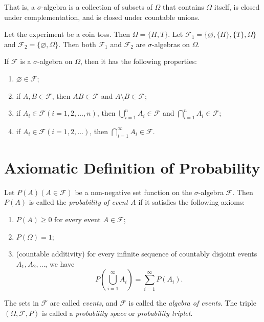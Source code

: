That is, a \(\sigma\)-algebra is a collection of subsets of \(\Omega\) that contains \(\Omega\) itself, is closed under complementation, and is closed under countable unions.

\begin{example}
  Let the experiment be a coin toss. Then \(\Omega = \{H, T\}\). Let \(\mathcal{F}_1 = \{\varnothing, \{H\}, \{T\}, \Omega\}\) and \(\mathcal{F}_2 = \{\varnothing, \Omega\}\). Then both \(\mathcal{F}_1\) and \(\mathcal{F}_2\) are \(\sigma\)-algebras on \(\Omega\).
\end{example}

\begin{proposition}
  If \(\mathcal{F}\) is a \(\sigma\)-algebra on \(\Omega\), then it has the following properties:
  \begin{enumerate}
    \item \(\varnothing \in \mathcal{F}\);
    \item if \(A, B \in \mathcal{F}\), then \(A B \in \mathcal{F}\) and \(A \setminus B \in \mathcal{F}\);
    \item if \(A_i \in \mathcal{F} (i = 1, 2, \dots, n)\), then \(\bigcup_{i=1}^n A_i \in \mathcal{F}\) and \(\bigcap_{i=1}^n A_i \in \mathcal{F}\);
    \item if \(A_i \in \mathcal{F} (i = 1, 2, \dots)\), then \(\bigcap_{i=1}^\infty A_i \in \mathcal{F}\).
  \end{enumerate}
\end{proposition}

\section{Axiomatic Definition of Probability}

\begin{definition}[Probability]
  Let \(P(A) (A \in \mathcal{F})\) be a non-negative set function on the \(\sigma\)-algebra \(\mathcal{F}\). Then \(P(A)\) is called the \emph{probability of event \(A\)} if it satisfies the following axioms:
  \begin{enumerate}
    \item \(P(A) \geq 0\) for every event \(A \in \mathcal{F}\);
    \item \(P(\Omega) = 1\);
    \item (countable additivity) for every infinite sequence of countably disjoint events \(A_1, A_2, \dots\), we have
    \[
      P\left(\bigcup_{i=1}^\infty A_i\right) = \sum_{i=1}^\infty P(A_i).
    \]
  \end{enumerate}
  The sets in \(\mathcal{F}\) are called \emph{events}, and \(\mathcal{F}\) is called the \emph{algebra of events}. The triple \((\Omega, \mathcal{F}, P)\) is called a \emph{probability space} or \emph{probability triplet}.
\end{definition}

